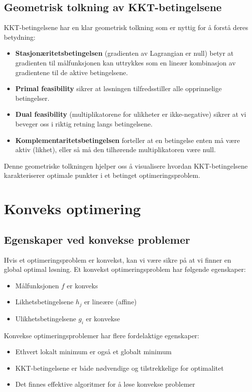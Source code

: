 \section{Geometrisk tolkning av KKT-betingelsene}

KKT-betingelsene har en klar geometrisk tolkning som er nyttig for å forstå deres betydning:

\begin{itemize}
	\item \textbf{Stasjonæritetsbetingelsen} (gradienten av Lagrangian er null) betyr at gradienten til målfunksjonen kan uttrykkes som en lineær kombinasjon av gradientene til de aktive betingelsene.
	\item \textbf{Primal feasibility} sikrer at løsningen tilfredsstiller alle opprinnelige betingelser.
	\item \textbf{Dual feasibility} (multiplikatorene for ulikheter er ikke-negative) sikrer at vi beveger oss i riktig retning langs betingelsene.
	\item \textbf{Komplementaritetsbetingelsen} forteller at en betingelse enten må være aktiv (likhet), eller så må den tilhørende multiplikatoren være null.
\end{itemize}

Denne geometriske tolkningen hjelper oss å visualisere hvordan KKT-betingelsene karakteriserer optimale punkter i et betinget optimeringsproblem.

\chapter{Konveks optimering}

\section{Egenskaper ved konvekse problemer}

Hvis et optimeringsproblem er konvekst, kan vi være sikre på at vi finner en global optimal løsning. Et konvekst optimeringsproblem har følgende egenskaper:
\begin{itemize}
	\item Målfunksjonen $f$ er konveks
	\item Likhetsbetingelsene $h_j$ er lineære (affine)
	\item Ulikhetsbetingelsene $g_i$ er konvekse
\end{itemize}

Konvekse optimeringsproblemer har flere fordelaktige egenskaper:
\begin{itemize}
	\item Ethvert lokalt minimum er også et globalt minimum
	\item KKT-betingelsene er både nødvendige og tilstrekkelige for optimalitet
	\item Det finnes effektive algoritmer for å løse konvekse problemer
\end{itemize}

